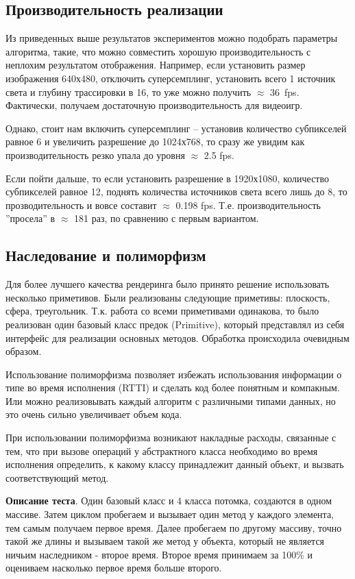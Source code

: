 \documentclass[12pt, a4paper, utf8]{article}
\begin{document}
\subsection{Производительность реализации}

Из приведенных выше результатов экспериментов можно подобрать параметры алгоритма, такие, что можно совместить хорошую производительность с неплохим результатом отображения. 
Например, если установить размер изображения 640х480, отключить суперсемплинг, установить всего 1 источник света и глубину трассировки в 16, то уже можно получить $\approx$ 36~fps. Фактически, получаем достаточную производительность для видеоигр.

Однако, стоит нам включить суперсемплинг -- установив количество субпикселей равное 6 и увеличить разрешение до 1024х768, то сразу же увидим как производительность резко упала до уровня $\approx$ 2.5 fps.

Если пойти дальше, то если установить разрешение в 1920х1080, количество субпикселей равное 12, поднять количества источников света всего лишь до 8, то прозводительность и вовсе составит $\approx$ 0.198 fps. Т.е. производительность ''просела'' в $\approx$ 181 раз, по сравнению с первым вариантом.

\subsection{Наследование и полиморфизм}

Для более лучшего качества рендеринга было принято решение использовать несколько приметивов. Были реализованы следующие приметивы: плоскость, сфера, треугольник. Т.к. работа со всеми приметивами одинакова, то было реализован один базовый класс предок (Primitive), который представлял из себя интерфейс для реализации основных методов. Обработка происходила очевидным образом. 

Использование полиморфизма позволяет избежать использования информации о типе во время исполнения (RTTI) и сделать код более понятным и компакным. Или можно реализовывать каждый алгоритм с различными типами данных, но это очень сильно увеличивает объем кода.

При использовании полиморфизма возникают накладные расходы, связанные с тем, что при вызове операций у абстрактного класса необходимо во время исполнения определить, к какому классу принадлежит данный объект, и вызвать соответствующий метод. 

\textbf{Описание теста}. Один базовый класс и 4 класса потомка, создаются в одном массиве. 
Затем циклом пробегаем и вызывает один метод у каждого элемента, тем самым получаем первое время.
Далее пробегаем по другому массиву, точно такой же длины и вызываем такой же метод у объекта, который не является ничьим наследником - второе время.
Второе время принимаем за 100\% и оцениваем насколько первое время больше второго. 
\end{document}
